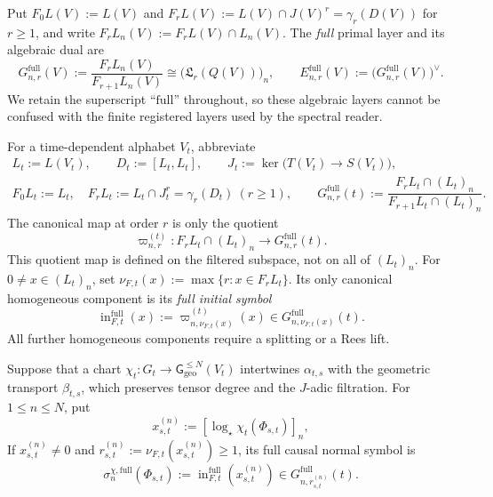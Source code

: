 \documentclass[10pt,reqno]{amsart}
\theoremstyle{plain}
\theoremstyle{definition}
\theoremstyle{remark}
\begin{document}
Put \(F_0L(V):=L(V)\) and
\(F_rL(V):=L(V)\cap J(V)^r=\gamma_r(D(V))\) for \(r\geq1\), and write
\(F_rL_n(V):=F_rL(V)\cap L_n(V)\).  The 
\emph{full} primal layer and its algebraic dual are
\begin{equation}
 G^{\mathrm{full}}_{n,r}(V):=
 \frac{F_rL_n(V)}{F_{r+1}L_n(V)}
 \cong\bigl({\mathfrak L}_r(Q(V))\bigr)_n,
 \qquad
 E^{\mathrm{full}}_{n,r}(V):=
 \bigl(G^{\mathrm{full}}_{n,r}(V)\bigr)^{\vee}.
 \label{cc:eq-exact-layer}
\end{equation}
We retain the superscript ``\(\mathrm{full}\)'' throughout, so these
algebraic layers cannot be confused with the finite registered layers used
by the spectral reader.

For a time-dependent alphabet \(V_t\), abbreviate
\begin{equation}
 \begin{gathered}
 L_t:=L(V_t),\qquad D_t:=[L_t,L_t],\qquad
 J_t:=\ker\bigl(T(V_t)\to S(V_t)\bigr),\\
 F_0L_t:=L_t,\quad
 F_rL_t:=L_t\cap J_t^r=\gamma_r(D_t)\ (r\geq1),\qquad
 G^{\mathrm{full}}_{n,r}(t):=
 \dfrac{F_rL_t\cap(L_t)_n}{F_{r+1}L_t\cap(L_t)_n}.
 \end{gathered}
 \label{cc:eq-fibrewise-full-layer}
\end{equation}
The canonical map at order \(r\) is only the quotient
\begin{equation}
 \varpi^{(t)}_{n,r}:
 F_rL_t\cap(L_t)_n\longrightarrow G^{\mathrm{full}}_{n,r}(t).
 \label{cc:eq-normal-symbol-quotient}
\end{equation}
This quotient map is defined on the filtered subspace, not on all of
\((L_t)_n\).  For \(0\ne x\in(L_t)_n\), set
\(\nu_{F,t}(x):=\max\{r:x\in F_rL_t\}\).  Its only canonical homogeneous
component is its \emph{full initial symbol}
\begin{equation}
 \operatorname{in}^{\mathrm{full}}_{F,t}(x)
 :=\varpi^{(t)}_{n,\nu_{F,t}(x)}(x)
 \in G^{\mathrm{full}}_{n,\nu_{F,t}(x)}(t).
 \label{cc:eq-canonical-initial-symbol}
\end{equation}
All further homogeneous components require a splitting or a Rees lift.

Suppose that a chart
\(\chi_t:G_t\to\mathsf G_{\mathrm{geo}}^{\le N}(V_t)\) intertwines
\(\alpha_{t,s}\) with the geometric transport \(\beta_{t,s}\), which
preserves tensor degree and the \(J\)-adic filtration.  For
\(1\leq n\leq N\), put
\begin{equation}
 x_{s,t}^{(n)}:=[\log_\star\chi_t(\Phi_{s,t})]_n,
 \label{cc:eq-charted-degree-n-logarithm}
\end{equation}
If \(x_{s,t}^{(n)}\ne0\) and
\(r_{s,t}^{(n)}:=\nu_{F,t}(x_{s,t}^{(n)})\geq1\), its full causal normal
symbol is
\begin{equation}
 \sigma_n^{\chi,\mathrm{full}}(\Phi_{s,t})
 :=\operatorname{in}^{\mathrm{full}}_{F,t}(x_{s,t}^{(n)})
 \in G^{\mathrm{full}}_{n,r_{s,t}^{(n)}}(t).
 \label{cc:eq-registered-normal-symbol}
\end{equation}
\end{document}
